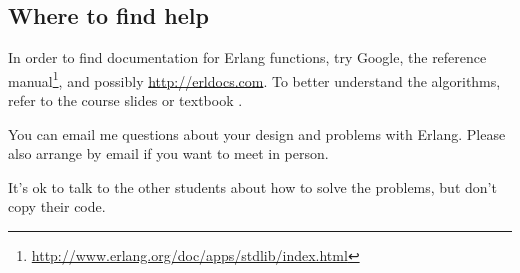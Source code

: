 %
%

\subsection{Where to find help} %
\label{sub:where_to_find_help}

In order to find documentation for Erlang functions, try Google, the reference
manual\footnote{\url{http://www.erlang.org/doc/apps/stdlib/index.html}}, and
possibly \url{http://erldocs.com}.
To better understand the algorithms, refer to the course slides or textbook
\cite{cachin2011}.

You can email me questions about your design and problems with Erlang. Please
also arrange by email if you want to meet in person.

It's ok to talk to the other students about how to solve the problems, but
don't copy their code.

